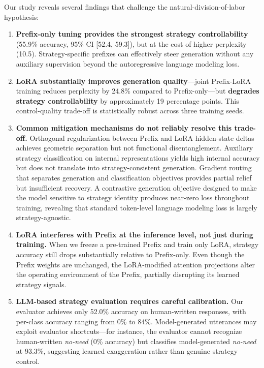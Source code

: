 \documentclass[conference]{IEEEtran}
\begin{document}
Our study reveals several findings that challenge the natural-division-of-labor hypothesis:

\begin{enumerate}
\item \textbf{Prefix-only tuning provides the strongest strategy controllability} (55.9\% accuracy, 95\% CI [52.4, 59.3]), but at the cost of higher perplexity (10.5). Strategy-specific prefixes can effectively steer generation without any auxiliary supervision beyond the autoregressive language modeling loss.

\item \textbf{LoRA substantially improves generation quality}---joint Prefix-LoRA training reduces perplexity by 24.8\% compared to Prefix-only---but \textbf{degrades strategy controllability} by approximately 19 percentage points. This control-quality trade-off is statistically robust across three training seeds.

\item \textbf{Common mitigation mechanisms do not reliably resolve this trade-off.} Orthogonal regularization between Prefix and LoRA hidden-state deltas achieves geometric separation but not functional disentanglement. Auxiliary strategy classification on internal representations yields high internal accuracy but does not translate into strategy-consistent generation. Gradient routing that separates generation and classification objectives provides partial relief but insufficient recovery. A contrastive generation objective designed to make the model sensitive to strategy identity produces near-zero loss throughout training, revealing that standard token-level language modeling loss is largely strategy-agnostic.

\item \textbf{LoRA interferes with Prefix at the inference level, not just during training.} When we freeze a pre-trained Prefix and train only LoRA, strategy accuracy still drops substantially relative to Prefix-only. Even though the Prefix weights are unchanged, the LoRA-modified attention projections alter the operating environment of the Prefix, partially disrupting its learned strategy signals.

\item \textbf{LLM-based strategy evaluation requires careful calibration.} Our evaluator achieves only 52.0\% accuracy on human-written responses, with per-class accuracy ranging from 0\% to 84\%. Model-generated utterances may exploit evaluator shortcuts---for instance, the evaluator cannot recognize human-written \textit{no-need} (0\% accuracy) but classifies model-generated \textit{no-need} at 93.3\%, suggesting learned exaggeration rather than genuine strategy control.
\end{enumerate}
\end{document}
